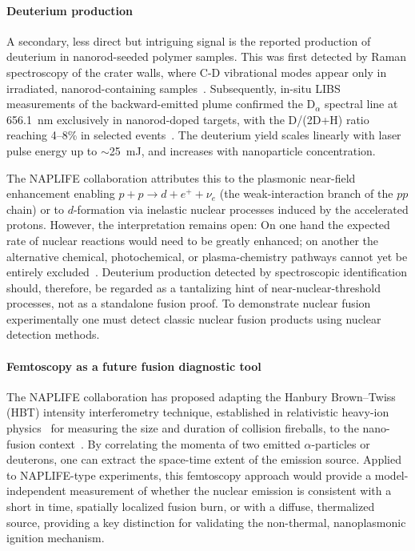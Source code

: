 \documentclass[particles,article,accept,pdftex,moreauthors]{Definitions/mdpi}
\begin{document}
\paragraph*{\bf Deuterium production}
A secondary, less direct but intriguing signal is the reported production of deuterium in nanorod-seeded polymer samples. This was first detected by Raman spectroscopy of the crater walls, where C-D vibrational modes appear only in irradiated, nanorod-containing samples~\cite{Csernai:2023PRE}. Subsequently, in-situ LIBS measurements of the backward-emitted plume confirmed the D$_\alpha$ spectral line at 656.1~nm exclusively in nanorod-doped targets, with the D/(2D+H) ratio reaching 4--8\% in selected events~\cite{Kroo:2024SciRep}. The deuterium yield scales linearly with laser pulse energy up to $\sim$25~mJ, and increases with nanoparticle concentration. 

The NAPLIFE collaboration attributes this to the plasmonic near-field enhancement enabling $p+p\to d+e^++\nu_e$ (the weak-interaction branch of the $pp$ chain) or to $d$-formation via inelastic nuclear processes induced by the accelerated protons. However, the interpretation remains open: On one hand the expected rate of nuclear reactions would need to be greatly enhanced; on another the alternative chemical, photochemical, or plasma-chemistry pathways cannot yet be entirely excluded~\cite{Kroo:2025HighField}. Deuterium production detected by spectroscopic identification should, therefore, be regarded as a tantalizing hint of near-nuclear-threshold processes, not as a standalone fusion proof. To demonstrate nuclear fusion experimentally one must detect classic nuclear fusion products using nuclear detection methods.

\paragraph*{\bf Femtoscopy as a future fusion diagnostic tool}
The NAPLIFE collaboration has proposed adapting the Hanbury Brown--Twiss (HBT) intensity interferometry technique, established in relativistic heavy-ion physics~\cite{Baym:1997ce} for measuring the size and duration of collision fireballs, to the nano-fusion context~\cite{Csernai:2024Universe}. By correlating the momenta of two emitted $\alpha$-particles or deuterons, one can extract the space-time extent of the emission source. Applied to NAPLIFE-type experiments, this femtoscopy approach would provide a model-independent measurement of whether the nuclear emission is consistent with a short in time, spatially localized fusion burn, or with a diffuse, thermalized source, providing a key distinction for validating the non-thermal, nanoplasmonic ignition mechanism. 
\end{document}
